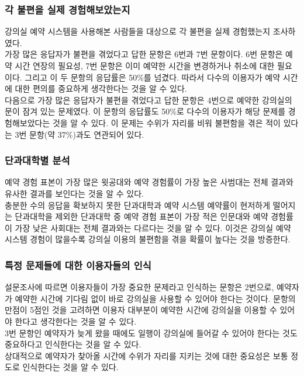 \documentclass[11pt,a4paper]{article}
\begin{document}
\subsubsection{각 불편을 실제 경험해보았는지}
강의실 예약 시스템을 사용해본 사람들을 대상으로 각 불편을 실제 경험했는지 조사하였다.\\
가장 많은 응답자가 불편을 겪었다고 답한 문항은 6번과 7번 문항이다. 6번 문항은 예약 시간 연장의 필요성, 7번 문항은 이미 예약한 시간을 변경하거나 취소에 대한 필요이다. 그리고 이 두 문항의 응답률은 50\%를 넘겼다. 따라서 다수의 이용자가 예약 시간에 대한 편의를 중요하게 생각한다는 것을 알 수 있다.\\
다음으로 가장 많은 응답자가 불편을 겪었다고 답한 문항은 4번으로 예약한 강의실의 문이 잠겨 있는 문제였다. 이 문항의 응답률도 50\%로 다수의 이용자가 해당 문제를 경험해보았다는 것을 알 수 있다. 이 문제는 수위가 자리를 비워 불편함을 겪은 적이 있다는 3번 문항(약 37\%)과도 연관되어 있다.\\

\subsubsection{단과대학별 분석}
예약 경험 표본이 가장 많은 윗공대와 예약 경험률이 가장 높은 사범대는 전체 결과와 유사한 결과를 보인다는 것을 알 수 있다.\\
충분한 수의 응답을 확보하지 못한 단과대학과 예약 시스템 예약률이 현저하게 떨어지는 단과대학을 제외한 단과대학 중 예약 경험 표본이 가장 적은 인문대와 예약 경험률이 가장 낮은 사회대는 전체 결과와는 다르다는 것을 알 수 있다. 이것은 강의실 예약 시스템 경험이 많을수록 강의실 이용의 불편함을 겪을 확률이 높다는 것을 방증한다.

\subsubsection{특정 문제들에 대한 이용자들의 인식}
설문조사에 따르면 이용자들이 가장 중요한 문제라고 인식하는 문항은 2번으로, 예약자가 예약한 시간에 기다림 없이 바로 강의실을 사용할 수 있어야 한다는 것이다. 문항의 만점이 5점인 것을 고려하면 이용자 대부분이 예약한 시간에 강의실을 이용할 수 있어야 한다고 생각한다는 것을 알 수 있다.\\
3번 문항인 예약자가 늦게 왔을 때에도 일행이 강의실에 들어갈 수 있어야 한다는 것도 중요하다고 인식한다는 것을 알 수 있다.\\
상대적으로 예약자가 찾아올 시간에 수위가 자리를 지키는 것에 대한 중요성은 보통 정도로 인식한다는 것을 알 수 있다.
\end{document}
